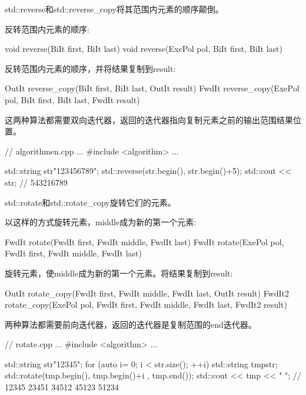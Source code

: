 
std::reverse和std::reverse\_copy将其范围内元素的顺序颠倒。

反转范围内元素的顺序:

\begin{cpp}
void reverse(BiIt first, BiIt last)
void reverse(ExePol pol, BiIt first, BiIt last)
\end{cpp}

反转范围内元素的顺序，并将结果复制到result:

\begin{cpp}
OutIt reverse_copy(BiIt first, BiIt last, OutIt result)
FwdIt reverse_copy(ExePol pol, BiIt first, BiIt last, FwdIt result)
\end{cpp}

这两种算法都需要双向迭代器，返回的迭代器指向复制元素之前的输出范围结果位置。


\begin{cpp}
// algorithmen.cpp
...
#include <algorithm>
...

std::string str{"123456789"};
std::reverse(str.begin(), str.begin()+5);
std::cout << str; // 543216789
\end{cpp}


std::rotate和std::rotate\_copy旋转它们的元素。

以这样的方式旋转元素，middle成为新的第一个元素:

\begin{cpp}
FwdIt rotate(FwdIt first, FwdIt middle, FwdIt last)
FwdIt rotate(ExePol pol, FwdIt first, FwdIt middle, FwdIt last)
\end{cpp}

旋转元素，使middle成为新的第一个元素。将结果复制到result:

\begin{cpp}
OutIt rotate_copy(FwdIt first, FwdIt middle, FwdIt last, OutIt result)
FwdIt2 rotate_copy(ExePol pol, FwdIt first, FwdIt middle, FwdIt last,
				   FwdIt2 result)
\end{cpp}

两种算法都需要前向迭代器，返回的迭代器是复制范围的end迭代器。


\begin{cpp}
// rotate.cpp
...
#include <algorithm>
...

std::string str{"12345"};
for (auto i= 0; i < str.size(); ++i){
	std::string tmp{str};
	std::rotate(tmp.begin(), tmp.begin()+i , tmp.end());
	std::cout << tmp << " ";
} // 12345 23451 34512 45123 51234
\end{cpp}


